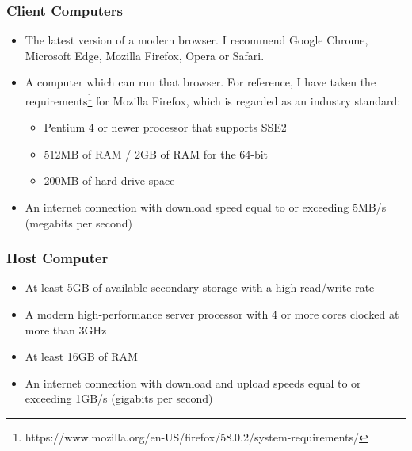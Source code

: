 ﻿\documentclass{article}
\begin{document}
    \subsubsection{Client Computers}
    \begin{itemize}
    \item The latest version of a modern browser. 
    I recommend Google Chrome, Microsoft Edge, Mozilla Firefox, Opera or Safari.
    \item A computer which can run that browser. For reference, I have taken the requirements\footnote{https://www.mozilla.org/en-US/firefox/58.0.2/system-requirements/} for Mozilla Firefox, which is regarded as an industry standard:
    \begin{itemize}
    \item Pentium 4 or newer processor that supports SSE2
    \item 512MB of RAM / 2GB of RAM for the 64-bit 
    \item 200MB of hard drive space
    \end{itemize}
    \item An internet connection with download speed equal to or exceeding 5MB/s (megabits per second)
    \end{itemize}
    
    \subsubsection{Host Computer}
    \begin{itemize}
    \item At least 5GB of available secondary storage with a high read/write rate
    \item A modern high-performance server processor with 4 or more cores clocked at more than 3GHz
    \item At least 16GB of RAM
    \item An internet connection with download and upload speeds equal to or exceeding 1GB/s (gigabits per second)
    \end{itemize}
    
\end{document}
